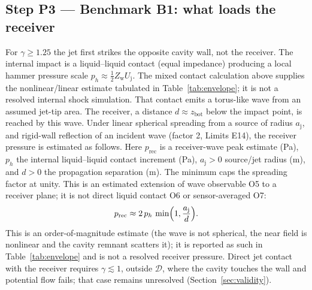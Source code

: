 \subsection{Step P3 --- Benchmark B1: what loads the receiver}
For $\gamma\ge1.25$ the jet first strikes the opposite cavity wall, not the receiver. The internal impact is a
liquid--liquid contact (equal impedance) producing a local hammer pressure scale
$p_h\approx\tfrac12Z_{\mathrm w}U_{\mathrm j}$. The mixed contact calculation above supplies the
nonlinear/linear estimate tabulated in Table~\ref{tab:envelope}; it is not a resolved internal
shock simulation. That contact emits a torus-like wave from an assumed jet-tip area.
The receiver, a distance $d\approx z_{\mathrm{bot}}$ below the impact point, is reached
by this wave. Under linear spherical spreading from a source of radius $a_{\mathrm j}$, and rigid-wall reflection
of an incident wave (factor 2, Limits E14), the receiver pressure is estimated as follows.
Here $p_{\mathrm{rec}}$ is a receiver-wave peak estimate (Pa), $p_h$ the internal
liquid--liquid contact increment (Pa), $a_{\mathrm j}>0$ source/jet radius (m), and $d>0$
the propagation separation (m). The minimum caps the spreading factor at unity.
This is an estimated extension of wave observable O5 to a receiver plane; it is not direct
liquid contact O6 or sensor-averaged O7:
\begin{equation}
p_{\mathrm{rec}}\approx2\,p_h\,\min\Bigl(1,\frac{a_{\mathrm j}}{d}\Bigr).\label{eq:prec}
\end{equation}
This is an order-of-magnitude estimate (the wave is not spherical, the near field is nonlinear and the cavity
remnant scatters it); it is reported as such in Table~\ref{tab:envelope} and is not a resolved receiver pressure.
Direct jet contact with the receiver requires $\gamma\lesssim1$, outside $\mathcal D$, where the cavity touches the wall
and potential flow fails; that case remains unresolved (Section~\ref{sec:validity}).

